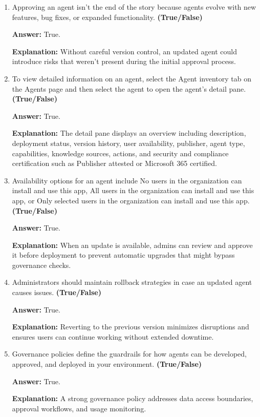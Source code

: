 \documentclass[10pt]{article}
\begin{document}
\begin{enumerate}[leftmargin=*]
\item Approving an agent isn’t the end of the story because agents evolve with new features, bug fixes, or expanded functionality. \textbf{(True/False)}

\textbf{Answer:} True.

\textbf{Explanation:} Without careful version control, an updated agent could introduce risks that weren’t present during the initial approval process.

\item To view detailed information on an agent, select the Agent inventory tab on the Agents page and then select the agent to open the agent’s detail pane. \textbf{(True/False)}

\textbf{Answer:} True.

\textbf{Explanation:} The detail pane displays an overview including description, deployment status, version history, user availability, publisher, agent type, capabilities, knowledge sources, actions, and security and compliance certification such as Publisher attested or Microsoft 365 certified.

\item Availability options for an agent include No users in the organization can install and use this app, All users in the organization can install and use this app, or Only selected users in the organization can install and use this app. \textbf{(True/False)}

\textbf{Answer:} True.

\textbf{Explanation:} When an update is available, admins can review and approve it before deployment to prevent automatic upgrades that might bypass governance checks.

\item Administrators should maintain rollback strategies in case an updated agent causes issues. \textbf{(True/False)}

\textbf{Answer:} True.

\textbf{Explanation:} Reverting to the previous version minimizes disruptions and ensures users can continue working without extended downtime.

\item Governance policies define the guardrails for how agents can be developed, approved, and deployed in your environment. \textbf{(True/False)}

\textbf{Answer:} True.

\textbf{Explanation:} A strong governance policy addresses data access boundaries, approval workflows, and usage monitoring.


\end{enumerate}
\end{document}
